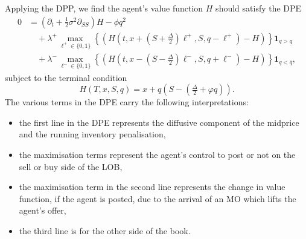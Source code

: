 \documentclass[11pt, a4paper]{book}
\newcommand{\Ind}{\mathbf{1}}
\begin{document}
	Applying the DPP, we find the agent's value function $H$ should satisfy the DPE
	\begin{align*}
		0 &= \left( \partial_t + \tfrac{1}{2}\sigma^2 \partial_{SS} \right) H - \phi q^2 \\
		&\quad + \lambda^+ \max_{\ell^+ \in \{0,1\}} \left\{ \left( H\left(t, x + (S + \tfrac{\Delta}{2})\ell^+, S, q - \ell^+\right) - H \right) \right\} \Ind_{q > \underline{q}} \\
		&\quad + \lambda^- \max_{\ell^- \in \{0,1\}} \left\{ \left( H\left(t, x - (S - \tfrac{\Delta}{2})\ell^-, S, q + \ell^-\right) - H \right) \right\} \Ind_{q < \bar{q}},
	\end{align*}
	subject to the terminal condition
	\[
	H(T, x, S, q) = x + q \left(S - (\tfrac{\Delta}{2} + \varphi q)\right).
	\]
	The various terms in the DPE carry the following interpretations:
	\begin{itemize}
		\item the first line in the DPE represents the diffusive component of the midprice and the running inventory penalisation,
		\item the maximisation terms represent the agent's control to post or not on the sell or buy side of the LOB,
		\item the maximisation term in the second line represents the change in value function, if the agent is posted, due to the arrival of an MO which lifts the agent's offer,
		\item the third line is for the other side of the book.
	\end{itemize}
	
\end{document}
